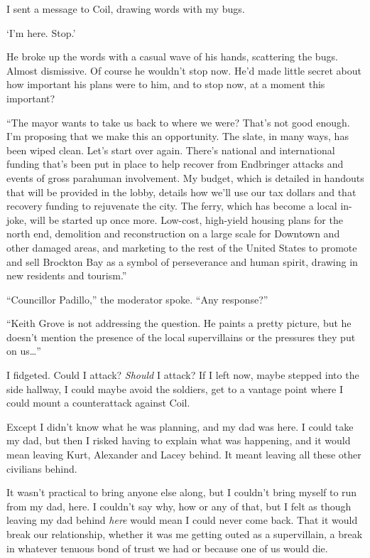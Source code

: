 I sent a message to Coil, drawing words with my bugs.



`I'm here.  Stop.'



He broke up the words with a casual wave of his hands, scattering the bugs.  Almost dismissive.  Of course he wouldn't stop now.  He'd made little secret about how important his plans were to him, and to stop now, at a moment this important?



``The mayor wants to take us back to where we were?  That's not good enough.  I'm proposing that we make this an opportunity.  The slate, in many ways, has been wiped clean.  Let's start over again.  There's national and international funding that's been put in place to help recover from Endbringer attacks and events of gross parahuman involvement.  My budget, which is detailed in handouts that will be provided in the lobby, details how we'll use our tax dollars and that recovery funding to rejuvenate the city.  The ferry, which has become a local in-joke, will be started up once more.  Low-cost, high-yield housing plans for the north end, demolition and reconstruction on a large scale for Downtown and other damaged areas, and marketing to the rest of the United States to promote and sell Brockton Bay as a symbol of perseverance and human spirit, drawing in new residents and tourism.''



``Councillor Padillo,'' the moderator spoke.  ``Any response?''



``Keith Grove is not addressing the question.  He paints a pretty picture, but he doesn't mention the presence of the local supervillains or the pressures they put on us\ldots''



I fidgeted.  Could I attack?  \emph{Should }I attack?  If I left now, maybe stepped into the side hallway, I could maybe avoid the soldiers, get to a vantage point where I could mount a counterattack against Coil.



Except I didn't know what he was planning, and my dad was here.  I could take my dad, but then I risked having to explain what was happening, and it would mean leaving Kurt, Alexander and Lacey behind.  It meant leaving all these other civilians behind.



It wasn't practical to bring anyone else along, but I couldn't bring myself to run from my dad, here.  I couldn't say why, how or any of that, but I felt as though leaving my dad behind \emph{here} would mean I could never come back.  That it would break our relationship, whether it was me getting outed as a supervillain, a break in whatever tenuous bond of trust we had or because one of us would die.



